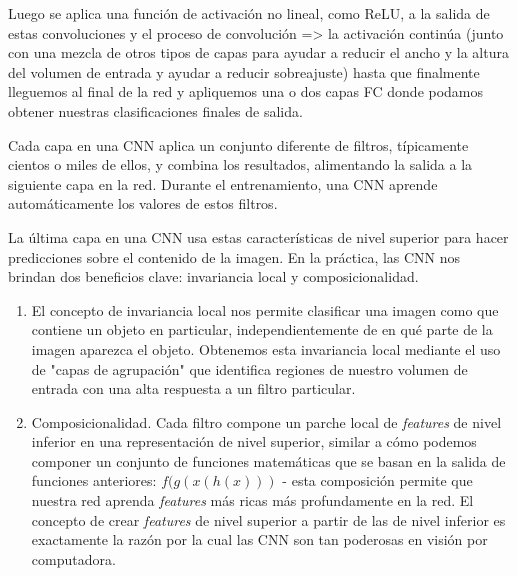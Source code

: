 \documentclass[14.5pt,a4paper]{article}
\begin{document}
Luego se aplica una función de activación no lineal, como ReLU, a la salida de estas convoluciones y el proceso de convolución => la activación continúa (junto con una mezcla de otros tipos de capas para ayudar a reducir el ancho y la altura del volumen de entrada y ayudar a reducir sobreajuste) hasta que finalmente lleguemos al final de la red y apliquemos una o dos capas FC donde podamos obtener nuestras clasificaciones finales de salida.

Cada capa en una CNN aplica un conjunto diferente de filtros, típicamente cientos o miles de ellos, y combina los resultados, alimentando la salida a la siguiente capa en la red. Durante el entrenamiento, una CNN aprende automáticamente los valores de estos filtros.

La última capa en una CNN usa estas características de nivel superior para hacer predicciones sobre el contenido de la imagen. En la práctica, las CNN nos brindan dos beneficios clave: invariancia local y composicionalidad. 
\begin{enumerate}

\item El concepto de invariancia local nos permite clasificar una imagen como que contiene un objeto en particular, independientemente de en qué parte de la imagen aparezca el objeto. Obtenemos esta invariancia local mediante el uso de "capas de agrupación" que identifica regiones de nuestro volumen de entrada con una alta respuesta a un filtro particular.

\item Composicionalidad. Cada filtro compone un parche local de \textit{features} de nivel inferior en una representación de nivel superior, similar a cómo podemos componer un conjunto de funciones matemáticas que se basan en la salida de funciones anteriores: $f (g (x (h (x)))$ - esta composición permite que nuestra red aprenda \textit{features} más ricas más profundamente en la red. El concepto de crear \textit{features} de nivel superior a partir de las de nivel inferior es exactamente la razón por la cual las CNN son tan poderosas en visión por computadora.

\end{enumerate}
\end{document}
